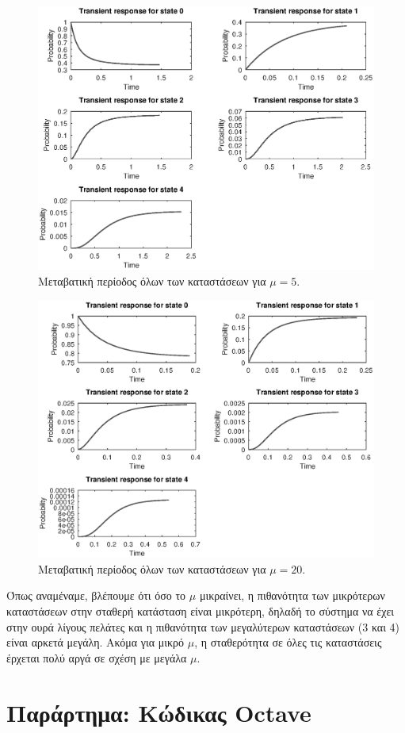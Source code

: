 \documentclass {article}
\newcommand{\english}[1]{\foreignlanguage{english}{#1}}
\begin{document}
\begin{figure}
	\includegraphics[width=\linewidth]{trans_mu_5}
	\caption{Μεταβατική περίοδος όλων των καταστάσεων για $μ = 5$.}
	\label{fig:trans__mu_5}
\end{figure}

\begin{figure}
	\includegraphics[width=\linewidth]{trans_mu_20}
	\caption{Μεταβατική περίοδος όλων των καταστάσεων για $μ = 20$.}
	\label{fig:trans_mu_20}
\end{figure}

Όπως αναμέναμε, βλέπουμε ότι όσο το $μ$ μικραίνει, η πιθανότητα των μικρότερων καταστάσεων στην σταθερή κατάσταση είναι μικρότερη, δηλαδή το σύστημα να έχει στην ουρά λίγους πελάτες και η πιθανότητα των μεγαλύτερων καταστάσεων (3 και 4) είναι αρκετά μεγάλη. Ακόμα για μικρό $μ$, η σταθερότητα σε όλες τις καταστάσεις έρχεται πολύ αργά σε σχέση με μεγάλα $μ$.

\section*{Παράρτημα: Κώδικας \english{Octave}}


\end{document}
